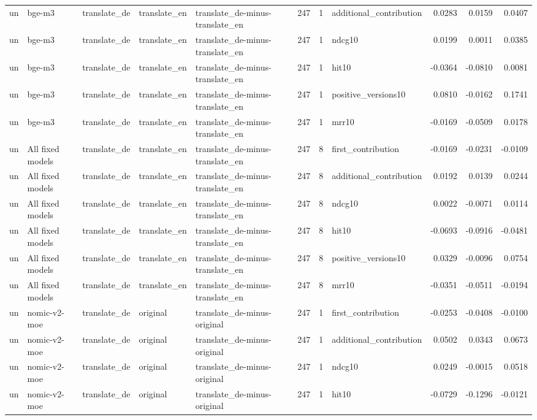 \begin{tabular}{lllllrrlrrr}
un & bge-m3 & translate\_de & translate\_en & translate\_de-minus-translate\_en & 247 & 1 & additional\_contribution & 0.0283 & 0.0159 & 0.0407 \\
un & bge-m3 & translate\_de & translate\_en & translate\_de-minus-translate\_en & 247 & 1 & ndcg10 & 0.0199 & 0.0011 & 0.0385 \\
un & bge-m3 & translate\_de & translate\_en & translate\_de-minus-translate\_en & 247 & 1 & hit10 & -0.0364 & -0.0810 & 0.0081 \\
un & bge-m3 & translate\_de & translate\_en & translate\_de-minus-translate\_en & 247 & 1 & positive\_versions10 & 0.0810 & -0.0162 & 0.1741 \\
un & bge-m3 & translate\_de & translate\_en & translate\_de-minus-translate\_en & 247 & 1 & mrr10 & -0.0169 & -0.0509 & 0.0178 \\
un & All fixed models & translate\_de & translate\_en & translate\_de-minus-translate\_en & 247 & 8 & first\_contribution & -0.0169 & -0.0231 & -0.0109 \\
un & All fixed models & translate\_de & translate\_en & translate\_de-minus-translate\_en & 247 & 8 & additional\_contribution & 0.0192 & 0.0139 & 0.0244 \\
un & All fixed models & translate\_de & translate\_en & translate\_de-minus-translate\_en & 247 & 8 & ndcg10 & 0.0022 & -0.0071 & 0.0114 \\
un & All fixed models & translate\_de & translate\_en & translate\_de-minus-translate\_en & 247 & 8 & hit10 & -0.0693 & -0.0916 & -0.0481 \\
un & All fixed models & translate\_de & translate\_en & translate\_de-minus-translate\_en & 247 & 8 & positive\_versions10 & 0.0329 & -0.0096 & 0.0754 \\
un & All fixed models & translate\_de & translate\_en & translate\_de-minus-translate\_en & 247 & 8 & mrr10 & -0.0351 & -0.0511 & -0.0194 \\
un & nomic-v2-moe & translate\_de & original & translate\_de-minus-original & 247 & 1 & first\_contribution & -0.0253 & -0.0408 & -0.0100 \\
un & nomic-v2-moe & translate\_de & original & translate\_de-minus-original & 247 & 1 & additional\_contribution & 0.0502 & 0.0343 & 0.0673 \\
un & nomic-v2-moe & translate\_de & original & translate\_de-minus-original & 247 & 1 & ndcg10 & 0.0249 & -0.0015 & 0.0518 \\
un & nomic-v2-moe & translate\_de & original & translate\_de-minus-original & 247 & 1 & hit10 & -0.0729 & -0.1296 & -0.0121 \\

\end{tabular}
